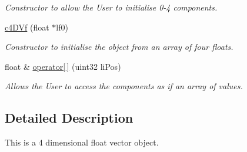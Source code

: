 \begin{DoxyCompactItemize}
\begin{DoxyCompactList}\small\item\em Constructor to allow the User to initialise 0-\/4 components. \end{DoxyCompactList}\item 
\hypertarget{classc4_d_vf_a4a63fad04854167e430ffd9ab5f850e0}{
\hyperlink{classc4_d_vf_a4a63fad04854167e430ffd9ab5f850e0}{c4DVf} (float $\ast$lf0)}
\label{classc4_d_vf_a4a63fad04854167e430ffd9ab5f850e0}

\begin{DoxyCompactList}\small\item\em Constructor to initialise the object from an array of four floats. \end{DoxyCompactList}\item 
\hypertarget{classc4_d_vf_a225398785d1875368d8d7fc8a2eca3ec}{
float \& \hyperlink{classc4_d_vf_a225398785d1875368d8d7fc8a2eca3ec}{operator\mbox{[}$\,$\mbox{]}} (uint32 liPos)}
\label{classc4_d_vf_a225398785d1875368d8d7fc8a2eca3ec}

\begin{DoxyCompactList}\small\item\em Allows the User to access the components as if an array of values. \end{DoxyCompactList}\end{DoxyCompactItemize}


\subsection{Detailed Description}
This is a 4 dimensional float vector object. 